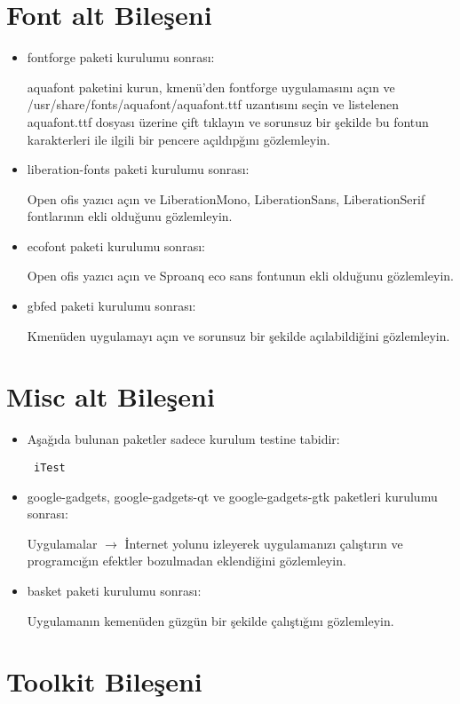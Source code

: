 \documentclass[a4paper,10pt]{article}
\begin{document}
\section{Font alt Bileşeni}
\begin{itemize}
 \item fontforge paketi kurulumu sonrası:

aquafont paketini kurun, kmenü'den fontforge uygulamasını açın ve /usr/share/fonts/aquafont/aquafont.ttf uzantısını seçin ve listelenen aquafont.ttf  dosyası üzerine çift tıklayın ve sorunsuz bir şekilde bu fontun karakterleri ile ilgili bir pencere açıldıpğını gözlemleyin.
\item liberation-fonts paketi kurulumu sonrası:

Open ofis yazıcı açın ve LiberationMono, LiberationSans, LiberationSerif fontlarının ekli olduğunu gözlemleyin.

\item ecofont paketi kurulumu sonrası:

Open ofis yazıcı açın ve Sproanq eco sans fontunun ekli olduğunu gözlemleyin.
\item gbfed paketi kurulumu sonrası:

Kmenüden uygulamayı açın ve sorunsuz bir şekilde açılabildiğini gözlemleyin.
\end{itemize}

\section{Misc alt Bileşeni}
\begin{itemize}
\item Aşağıda bulunan paketler sadece kurulum testine tabidir:
\begin{verbatim}
 iTest
\end{verbatim}


\item google-gadgets, google-gadgets-qt ve google-gadgets-gtk paketleri kurulumu sonrası:

Uygulamalar $\rightarrow$ İnternet yolunu izleyerek uygulamanızı çalıştırın ve programcığın efektler bozulmadan eklendiğini gözlemleyin.

\item basket paketi kurulumu sonrası:

Uygulamanın kemenüden güzgün bir şekilde çalıştığını gözlemleyin.

\end{itemize}

\section{Toolkit Bileşeni}
\end{document}
